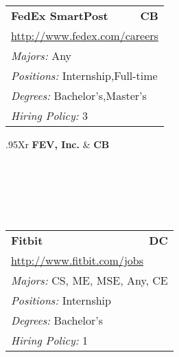 \documentclass[twoside]{article}
\begin{document}
\begin{center}
\begin{multicols}{3}
\begin{FlushLeft}
\begin{minipage}{.9\columnwidth}
\end{minipage}
 
\begin{minipage}{.9\columnwidth}\begin{tabularx}{.95\columnwidth}{Xr}
                 {\Large\bf FedEx SmartPost} & {\Large\bf CB}\\
    \multicolumn{2}{p{.95\columnwidth}}{\url{http://www.fedex.com/careers}}\\
    \multicolumn{2}{p{.95\columnwidth}}{\emph{Majors:} Any}\\
    \multicolumn{2}{p{.95\columnwidth}}{\emph{Positions:} Internship,Full-time}\\
    \multicolumn{2}{p{.95\columnwidth}}{\emph{Degrees:} Bachelor's,Master's}\\
    \multicolumn{2}{p{.95\columnwidth}}{\emph{Hiring Policy:} 3}\\
    \end{tabularx}
    
\end{minipage}
 
\begin{minipage}{.9\columnwidth}\begin{tabularx}{.95\columnwidth}{Xr}
                 {\Large\bf FEV, Inc.} & {\Large\bf CB}\\
    \\
    \\
    \\
    \\
    \\
    \end{tabularx}
    
\end{minipage}
 
\begin{minipage}{.9\columnwidth}\begin{tabularx}{.95\columnwidth}{Xr}
                 {\Large\bf Fitbit} & {\Large\bf DC}\\
    \multicolumn{2}{p{.95\columnwidth}}{\url{http://www.fitbit.com/jobs}}\\
    \multicolumn{2}{p{.95\columnwidth}}{\emph{Majors:} CS, ME, MSE, Any, CE}\\
    \multicolumn{2}{p{.95\columnwidth}}{\emph{Positions:} Internship}\\
    \multicolumn{2}{p{.95\columnwidth}}{\emph{Degrees:} Bachelor's}\\
    \multicolumn{2}{p{.95\columnwidth}}{\emph{Hiring Policy:} 1}\\
    \end{tabularx}
    

\end{minipage}
\end{FlushLeft}
\end{multicols}
\end{center}
\end{document}
